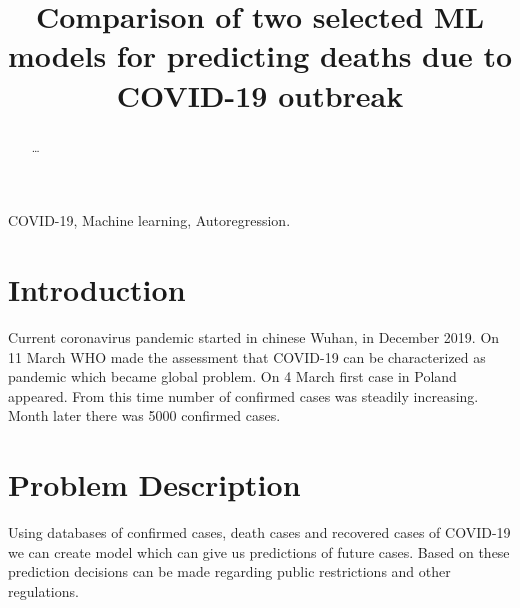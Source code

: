 \documentclass[conference]{IEEEtran}
\begin{document}
\title{Comparison of two selected ML models for predicting deaths due to COVID-19 outbreak}

\author{
\and
{}
}


\maketitle

\begin{abstract}
\dots
\end{abstract}

\begin{IEEEkeywords}
COVID-19, Machine learning, Autoregression.
\end{IEEEkeywords}

\section{Introduction}
Current coronavirus pandemic started in chinese Wuhan, in December 2019. On 11 March WHO made the assessment that COVID-19 can be
 characterized as pandemic which became global problem. On 4 March first case in Poland appeared. From this time number of confirmed cases was steadily increasing.
 Month later there was 5000 confirmed cases.

\section{Problem Description}
Using databases of confirmed cases, death cases and recovered cases of COVID-19 we can create model which can give us predictions of future cases.
 Based on these prediction decisions can be made regarding public restrictions and other regulations.
\end{document}
